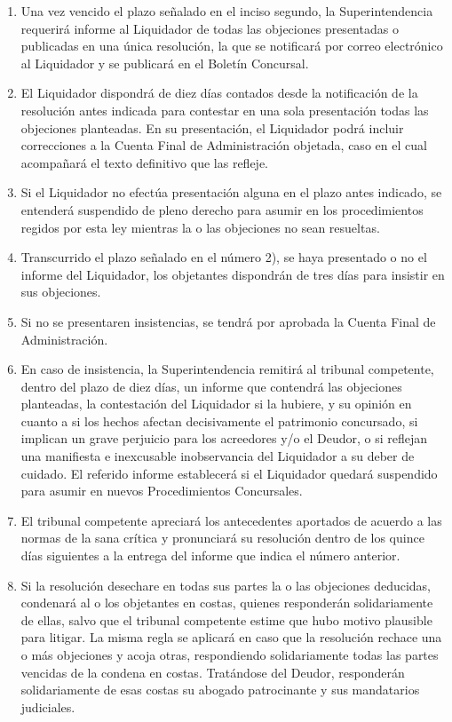 \documentclass[
]{book}
\begin{document}
\begin{enumerate}
\def\labelenumi{\arabic{enumi})}
\item
  Una vez vencido el plazo señalado en el inciso segundo, la Superintendencia requerirá informe al Liquidador de todas las objeciones presentadas o publicadas en una única resolución, la que se notificará por correo electrónico al Liquidador y se publicará en el Boletín Concursal.
\item
  El Liquidador dispondrá de diez días contados desde la notificación de la resolución antes indicada para contestar en una sola presentación todas las objeciones planteadas. En su presentación, el Liquidador podrá incluir correcciones a la Cuenta Final de Administración objetada, caso en el cual acompañará el texto definitivo que las refleje.
\item
  Si el Liquidador no efectúa presentación alguna en el plazo antes indicado, se entenderá suspendido de pleno derecho para asumir en los procedimientos regidos por esta ley mientras la o las objeciones no sean resueltas.
\item
  Transcurrido el plazo señalado en el número 2), se haya presentado o no el informe del Liquidador, los objetantes dispondrán de tres días para insistir en sus objeciones.
\item
  Si no se presentaren insistencias, se tendrá por aprobada la Cuenta Final de Administración.
\item
  En caso de insistencia, la Superintendencia remitirá al tribunal competente, dentro del plazo de diez días, un informe que contendrá las objeciones planteadas, la contestación del Liquidador si la hubiere, y su opinión en cuanto a si los hechos afectan decisivamente el patrimonio concursado, si implican un grave perjuicio para los acreedores y/o el Deudor, o si reflejan una manifiesta e inexcusable inobservancia del Liquidador a su deber de cuidado. El referido informe establecerá si el Liquidador quedará suspendido para asumir en nuevos Procedimientos Concursales.
\item
  El tribunal competente apreciará los antecedentes aportados de acuerdo a las normas de la sana crítica y pronunciará su resolución dentro de los quince días siguientes a la entrega del informe que indica el número anterior.
\item
  Si la resolución desechare en todas sus partes la o las objeciones deducidas, condenará al o los objetantes en costas, quienes responderán solidariamente de ellas, salvo que el tribunal competente estime que hubo motivo plausible para litigar. La misma regla se aplicará en caso que la resolución rechace una o más objeciones y acoja otras, respondiendo solidariamente todas las partes vencidas de la condena en costas. Tratándose del Deudor, responderán solidariamente de esas costas su abogado patrocinante y sus mandatarios judiciales.

\end{enumerate}
\end{document}
